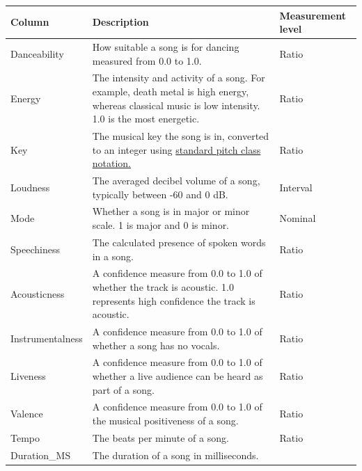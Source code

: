 \documentclass[12pt]{report}
\begin{document}
\begin{table}[H]
    \centering
    \begin{tabular}{ |p{}| p{}| p{}|}
        \hline
        \cellcolor{blue!25}Column & \cellcolor{blue!25}Description & \cellcolor{blue!25}Measurement level\\
            \hline
            Danceability & How suitable a song is for dancing measured from 0.0 to 1.0.
            & Ratio \\
            \hline
            Energy & The intensity and activity of a song. For example, death metal is high energy, whereas classical music is low intensity. 1.0 is the most energetic.
            & Ratio\\
            \hline
            Key & The musical key the song is in, converted to an integer using \href{https://smbutterfield.github.io/ibmt17-18/22-intro-to-non-diatonic-materials/b2-tx-pcintnotation.html}{standard pitch class notation.}\autocite{butterfield_22b_nodate} 
            & Ratio\\
            \hline
            Loudness & The averaged decibel volume of a song, typically between -60 and 0 dB.
            & Interval\\
            \hline
            Mode & Whether a song is in major or minor scale. 1 is major and 0 is minor.
            & Nominal\\
            \hline
            Speechiness & The calculated presence of spoken words in a song.
            & Ratio\\
            \hline
            Acousticness & A confidence measure from 0.0 to 1.0 of whether the track is acoustic. 1.0 represents high confidence the track is acoustic.
            & Ratio\\
            \hline
            Instrumentalness & A confidence measure from 0.0 to 1.0 of whether a song has no vocals.
            & Ratio\\
            \hline
            Liveness & A confidence measure from 0.0 to 1.0 of whether a live audience can be heard as part of a song.
            & Ratio\\
            \hline
            Valence & A confidence measure from 0.0 to 1.0 of the musical positiveness of a song.
            & Ratio\\
            \hline
            Tempo & The beats per minute of a song.
            & Ratio\\
            \hline
            Duration\_MS & The duration of a song in milliseconds.

\end{tabular}
\end{table}
\end{document}
